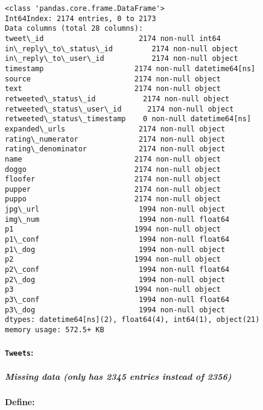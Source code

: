 \documentclass[11pt]{article}
\begin{document}
    \begin{Verbatim}[commandchars=\\\{\}]
<class 'pandas.core.frame.DataFrame'>
Int64Index: 2174 entries, 0 to 2173
Data columns (total 28 columns):
tweet\_id                      2174 non-null int64
in\_reply\_to\_status\_id         2174 non-null object
in\_reply\_to\_user\_id           2174 non-null object
timestamp                     2174 non-null datetime64[ns]
source                        2174 non-null object
text                          2174 non-null object
retweeted\_status\_id           2174 non-null object
retweeted\_status\_user\_id      2174 non-null object
retweeted\_status\_timestamp    0 non-null datetime64[ns]
expanded\_urls                 2174 non-null object
rating\_numerator              2174 non-null object
rating\_denominator            2174 non-null object
name                          2174 non-null object
doggo                         2174 non-null object
floofer                       2174 non-null object
pupper                        2174 non-null object
puppo                         2174 non-null object
jpg\_url                       1994 non-null object
img\_num                       1994 non-null float64
p1                            1994 non-null object
p1\_conf                       1994 non-null float64
p1\_dog                        1994 non-null object
p2                            1994 non-null object
p2\_conf                       1994 non-null float64
p2\_dog                        1994 non-null object
p3                            1994 non-null object
p3\_conf                       1994 non-null float64
p3\_dog                        1994 non-null object
dtypes: datetime64[ns](2), float64(4), int64(1), object(21)
memory usage: 572.5+ KB

    \end{Verbatim}

    \hypertarget{tweets}{%
\paragraph{\texorpdfstring{\texttt{Tweets}:}{Tweets:}}\label{tweets}}

\hypertarget{missing-data-only-has-2345-entries-instead-of-2356}{%
\subparagraph{Missing data (only has 2345 entries instead of
2356)}\label{missing-data-only-has-2345-entries-instead-of-2356}}

\hypertarget{define}{%
\paragraph{Define:}\label{define}}
\end{document}
